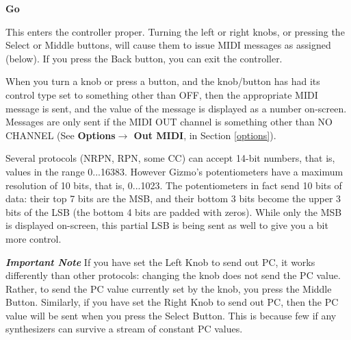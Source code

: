 \documentclass{article}
\begin{document}

	\begin{description}

	\item{\bf Go}
	
	This enters the controller proper.  Turning the left or right knobs, or pressing the Select or Middle buttons, will cause them to issue MIDI messages as assigned (below).  If you press the Back button, you can exit the controller.
	
	When you turn a knob or press a button, and the knob/button has had its control type set to something other than OFF, then the appropriate MIDI message is sent, and the value of the message is displayed as a number on-screen.  Messages are only sent if the MIDI OUT channel is something other than NO CHANNEL (See {\bf Options\(\boldsymbol\rightarrow\) Out MIDI}, in Section \ref{options}).
	
	Several protocols (NRPN, RPN, some CC) can accept 14-bit numbers, that is, values in the range 0...16383.  However Gizmo's potentiometers have a maximum resolution of 10 bits, that is, 0...1023.   The potentiometers in fact send 10 bits of data: their top 7 bits are the MSB, and their bottom 3 bits become the upper 3 bits of the LSB (the bottom 4 bits are padded with zeros).   While only the MSB is displayed on-screen, this partial LSB is being sent as well to give you a bit more control.  %

	{\bf \textit{Important Note}\quad} If you have set the Left Knob to send out PC, it works differently than other protocols: changing the knob does not send the PC value.  Rather, to send the PC value currently set by the knob, you press the Middle Button.  Similarly, if you have set the Right Knob to send out PC, then the PC value will be sent when you press the Select Button.  This is because few if any synthesizers can survive a stream of constant PC values.
	

\end{description}
\end{document}
